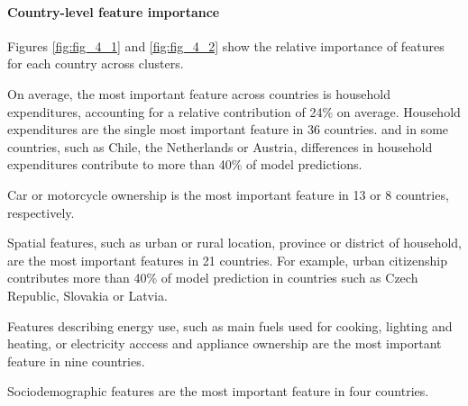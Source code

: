 \documentclass[12pt, a4paper]{article}
\begin{document}
\paragraph{Country-level feature importance}

Figures \ref{fig:fig_4_1} and \ref{fig:fig_4_2} show the relative importance of features for each country across clusters. %

On average, the most important feature across countries is household expenditures, accounting for a relative contribution of 24\% on average. Household expenditures are the single most important feature in 36 countries. and in some countries, such as Chile, the Netherlands or Austria, differences in household expenditures contribute to more than 40\% of model predictions.

Car or motorcycle ownership is the most important feature in 13 or 8 countries, respectively.

Spatial features, such as urban or rural location, province or district of household, are the most important features in 21 countries. For example, urban citizenship contributes more than 40\% of model prediction in countries such as Czech Republic, Slovakia or Latvia. 

Features describing energy use, such as main fuels used for cooking, lighting and heating, or electricity acccess and appliance ownership are the most important feature in nine countries.

Sociodemographic features are the most important feature in four countries.
\end{document}
